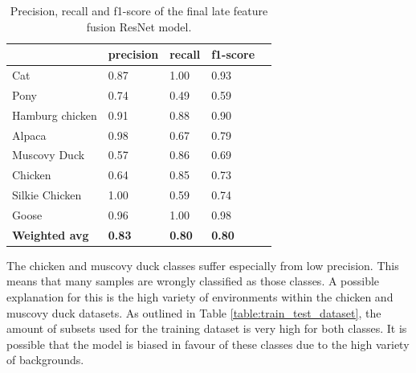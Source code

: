\documentclass{l4proj}
\begin{document}
\begin{table}[ht]
  \centering
  \begin{tabular}{@{}lllll@{}}
  \toprule
                        & \textbf{precision} & \textbf{recall} & \textbf{f1-score} &  \\ \midrule
  Cat                   & 0.87               & 1.00            & 0.93              &  \\
  Pony                  & 0.74               & 0.49            & 0.59              &  \\
  Hamburg chicken       & 0.91               & 0.88            & 0.90              &  \\
  Alpaca                & 0.98               & 0.67            & 0.79              &  \\
  Muscovy Duck          & 0.57               & 0.86            & 0.69              &  \\
  Chicken               & 0.64               & 0.85            & 0.73              &  \\
  Silkie Chicken        & 1.00               & 0.59            & 0.74              &  \\
  Goose                 & 0.96               & 1.00            & 0.98              &  \\
  \midrule
  \textbf{Weighted avg} & \textbf{0.83}      & \textbf{0.80}   & \textbf{0.80}     &  \\ \bottomrule
  \end{tabular}
  \caption{Precision, recall and f1-score of the final late feature fusion ResNet model.}
  \label{table:final_classifier_scores}
\end{table}

The chicken and muscovy duck classes suffer especially from low precision. This means that many samples are wrongly classified as those classes. A possible explanation for this is the high variety of environments within the chicken and muscovy duck datasets. As outlined in Table \ref{table:train_test_dataset}, the amount of subsets used for the training dataset is very high for both classes. It is possible that the model is biased in favour of these  classes due to the high variety of backgrounds.
\end{document}
